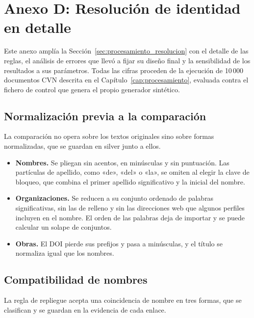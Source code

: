 \chapter*{Anexo D: Resolución de identidad en detalle}
\label{cap:anexo_resolucion}

\setcounter{section}{0}
\renewcommand{\thesection}{D.\arabic{section}}

Este anexo amplía la Sección~\ref{sec:procesamiento_resolucion} con el
detalle de las reglas, el análisis de errores que llevó a fijar su diseño
final y la sensibilidad de los resultados a sus parámetros. Todas las cifras
proceden de la ejecución de 10\,000 documentos CVN descrita en el
Capítulo~\ref{cap:procesamiento}, evaluada contra el fichero de control que
genera el propio generador sintético.

\section{Normalización previa a la comparación}
\label{sec:anexo_resolucion_normalizacion}

La comparación no opera sobre los textos originales sino sobre formas
normalizadas, que se guardan en silver junto a ellos.

\begin{itemize}
  \item \textbf{Nombres.} Se pliegan sin acentos, en minúsculas y sin
  puntuación. Las partículas de apellido, como «de», «del» o «la», se omiten
  al elegir la clave de bloqueo, que combina el primer apellido significativo
  y la inicial del nombre.
  \item \textbf{Organizaciones.} Se reducen a su conjunto ordenado de palabras
  significativas, sin las de relleno y sin las direcciones web que algunos
  perfiles incluyen en el nombre. El orden de las palabras deja de importar
  y se puede calcular un solape de conjuntos.
  \item \textbf{Obras.} El DOI pierde sus prefijos y pasa a minúsculas, y el
  título se normaliza igual que los nombres.
\end{itemize}

\section{Compatibilidad de nombres}
\label{sec:anexo_resolucion_nombres}

La regla de repliegue acepta una coincidencia de nombre en tres formas, que
se clasifican y se guardan en la evidencia de cada enlace.

